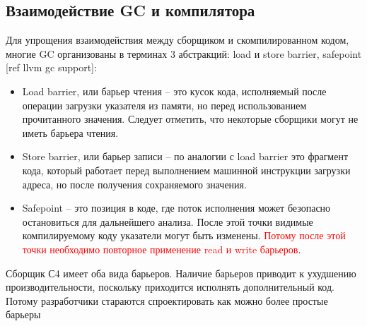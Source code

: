 \subsection{Взаимодействие GC и компилятора}
Для упрощения взаимодействия между сборщиком и скомпилированном кодом, многие GC организованы в терминах 3 абстракций: load и store barrier, safepoint [ref llvm gc support]:
\begin{itemize}
	\item Load barrier, или барьер чтения – это кусок кода, исполняемый после операции загрузки указателя из памяти, но перед использованием прочитанного значения. Следует отметить, что некоторые сборщики могут не иметь барьера чтения.
	\item Store barrier, или барьер записи  – по аналогии с load barrier это фрагмент кода, который работает перед выполнением машинной инструкции загрузки адреса, но после получения сохраняемого значения.
	\item Safepoint – это позиция в коде, где поток исполнения может безопасно остановиться для дальнейшего анализа. После этой точки видимые компилируемому коду указатели могут быть изменены. \textcolor{red}{Потому после этой точки необходимо повторное применение read и write барьеров}.
\end{itemize}
Сборщик С4 имеет оба вида барьеров. Наличие барьеров приводит к ухудшению производительности, поскольку приходится исполнять дополнительный код. Потому разработчики стараются спроектировать как можно более простые барьеры

